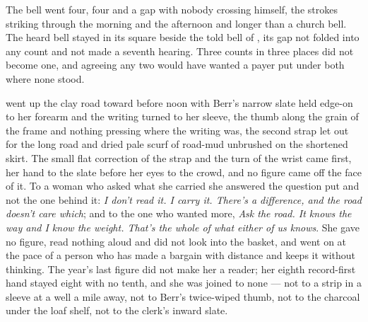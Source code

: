 The bell went four, four and a gap with nobody crossing himself, the strokes striking through the morning and the afternoon and longer than a church bell. The heard bell stayed in its square beside the told bell of , its gap not folded into any count and not made a seventh hearing. Three counts in three places did not become one, and agreeing any two would have wanted a payer put under both where none stood.

 went up the clay road toward  before noon with Berr's narrow slate held edge-on to her forearm and the writing turned to her sleeve, the thumb along the grain of the frame and nothing pressing where the writing was, the second strap let out for the long road and dried pale scurf of road-mud unbrushed on the shortened skirt. The small flat correction of the strap and the turn of the wrist came first, her hand to the slate before her eyes to the crowd, and no figure came off the face of it. To a woman who asked what she carried she answered the question put and not the one behind it: \emph{I don't read it. I carry it. There's a difference, and the road doesn't care which}; and to the one who wanted more, \emph{Ask the road. It knows the way and I know the weight. That's the whole of what either of us knows}. She gave no figure, read nothing aloud and did not look into the basket, and went on at the pace of a person who has made a bargain with distance and keeps it without thinking. The year's last figure did not make her a reader; her eighth record-first hand stayed eight with no tenth, and she was joined to none --- not to a strip in a sleeve at a well a mile away, not to Berr's twice-wiped thumb, not to the charcoal under the loaf shelf, not to the clerk's inward slate.

